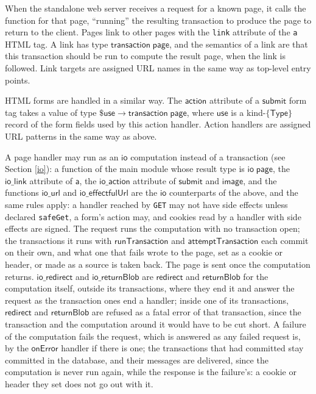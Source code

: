 \documentclass{article}
\newcommand{\mt}[1]{\mathsf{#1}}
\begin{document}
When the standalone web server receives a request for a known page, it calls the function for that page, ``running'' the resulting transaction to produce the page to return to the client.  Pages link to other pages with the \texttt{link} attribute of the \texttt{a} HTML tag.  A link has type $\mt{transaction} \; \mt{page}$, and the semantics of a link are that this transaction should be run to compute the result page, when the link is followed.  Link targets are assigned URL names in the same way as top-level entry points.

HTML forms are handled in a similar way.  The $\mt{action}$ attribute of a $\mt{submit}$ form tag takes a value of type $\$\mt{use} \to \mt{transaction} \; \mt{page}$, where $\mt{use}$ is a kind-$\{\mt{Type}\}$ record of the form fields used by this action handler.  Action handlers are assigned URL patterns in the same way as above.

A page handler may run as an $\mt{io}$ computation instead of a transaction (see Section \ref{io}): a function of the main module whose result type is $\mt{io} \; \mt{page}$, the $\mt{io\_link}$ attribute of $\mt{a}$, the $\mt{io\_action}$ attribute of $\mt{submit}$ and $\mt{image}$, and the functions $\mt{io\_url}$ and $\mt{io\_effectfulUrl}$ are the $\mt{io}$ counterparts of the above, and the same rules apply: a handler reached by \texttt{GET} may not have side effects unless declared \texttt{safeGet}, a form's action may, and cookies read by a handler with side effects are signed. The request runs the computation with no transaction open; the transactions it runs with $\mt{runTransaction}$ and $\mt{attemptTransaction}$ each commit on their own, and what one that fails wrote to the page, set as a cookie or header, or made as a source is taken back. The page is sent once the computation returns. $\mt{io\_redirect}$ and $\mt{io\_returnBlob}$ are $\mt{redirect}$ and $\mt{returnBlob}$ for the computation itself, outside its transactions, where they end it and answer the request as the transaction ones end a handler; inside one of its transactions, $\mt{redirect}$ and $\mt{returnBlob}$ are refused as a fatal error of that transaction, since the transaction and the computation around it would have to be cut short. A failure of the computation fails the request, which is answered as any failed request is, by the $\mt{onError}$ handler if there is one; the transactions that had committed stay committed in the database, and their messages are delivered, since the computation is never run again, while the response is the failure's: a cookie or header they set does not go out with it.
\end{document}
